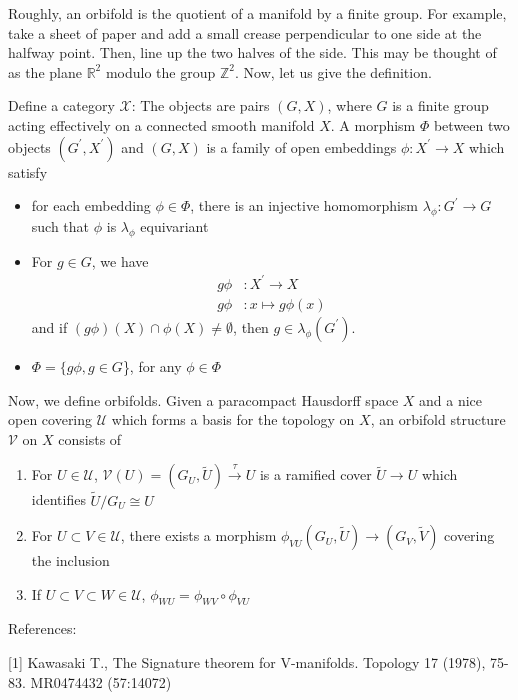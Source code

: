 \documentclass[12pt]{article}
\begin{document}
Roughly, an orbifold is the quotient of a manifold by a finite group.  For example, take a sheet of paper and add a small crease perpendicular to one side at the halfway point.  Then, line up the two halves of the side.  This may be thought of as the plane $\mathbb R^2$ modulo the group $\mathbb Z^2$.  Now, let us give the definition.

Define a category $\mathcal X$:
The objects are pairs $(G,X)$, where $G$ is a finite group acting
effectively on a connected smooth manifold $X$.  A morphism $\Phi$ between
two objects $(G^\prime, X^\prime)$ and $(G,X)$ is a family of open
embeddings $\phi:X^\prime\rightarrow X$ which satisfy

\begin{itemize}
\item for each embedding $\phi\in\Phi$, there is an injective homomorphism
$\lambda_\phi:G^\prime\rightarrow G$ such that $\phi$ is $\lambda_\phi$
equivariant
\item For $g\in G$, we have
\begin{align*}
g\phi&:X^\prime\rightarrow X\\
g\phi&:x\mapsto g\phi(x)
\end{align*}
and if $(g\phi)(X) \cap \phi(X) \ne \emptyset$, then $g\in
\lambda_\phi(G^\prime)$.
\item $\Phi = \{g\phi, g\in G$\}, for any $\phi \in \Phi$
\end{itemize}



Now, we define orbifolds.  Given a paracompact Hausdorff space $X$ and a
nice open covering $\mathcal U$ which forms a basis for the topology on
$X$, an orbifold structure $\mathcal V$ on $X$ consists of
\begin{enumerate}
\item For $U\in \mathcal U$, $\mathcal V(U) = (G_U,\tilde U)\stackrel \tau
\rightarrow U$ is a ramified cover $\tilde U \rightarrow U$ which
identifies $\tilde U\slash G_U \cong U$
\item For $U\subset V \in \mathcal U$, there exists a morphism
$\phi_{VU}(G_U, \tilde U)\rightarrow (G_V, \tilde V)$ covering the
inclusion
\item If $U\subset V\subset W \in \mathcal U$, $\phi_{WU} =
\phi_{WV}\circ\phi_{VU}$
\end{enumerate}

References:

[1] Kawasaki T., The Signature theorem for V-manifolds. Topology 17 (1978), 75-83. MR0474432
(57:14072)
\end{document}
